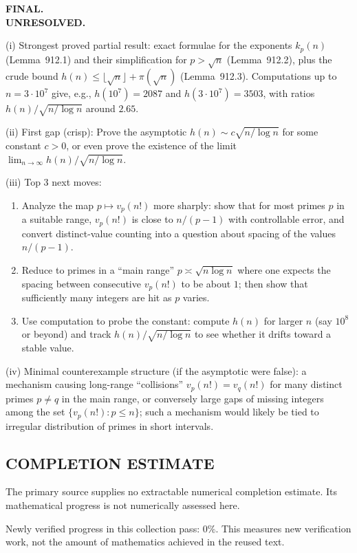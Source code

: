 \medskip
\noindent\textbf{FINAL.}\\
\textbf{UNRESOLVED.}

(i) Strongest proved partial result: exact formulae for the exponents $k_p(n)$ (Lemma~912.1) and their simplification for $p>\sqrt{n}$ (Lemma~912.2), plus the crude bound $h(n)\le \lfloor\sqrt n\rfloor+\pi(\sqrt n)$ (Lemma~912.3). Computations up to $n=3\cdot 10^7$ give, e.g., $h(10^7)=2087$ and $h(3\cdot 10^7)=3503$, with ratios $h(n)/\sqrt{n/\log n}$ around $2.65$.

(ii) First gap (crisp): Prove the asymptotic $h(n)\sim c\sqrt{n/\log n}$ for some constant $c>0$, or even prove the existence of the limit $\lim_{n\to\infty} h(n)/\sqrt{n/\log n}$.

(iii) Top 3 next moves:
\begin{enumerate}
\item Analyze the map $p\mapsto v_p(n!)$ more sharply: show that for most primes $p$ in a suitable range, $v_p(n!)$ is close to $n/(p-1)$ with controllable error, and convert distinct-value counting into a question about spacing of the values $n/(p-1)$.
\item Reduce to primes in a ``main range'' $p\asymp \sqrt{n\log n}$ where one expects the spacing between consecutive $v_p(n!)$ to be about $1$; then show that sufficiently many integers are hit as $p$ varies.
\item Use computation to probe the constant: compute $h(n)$ for larger $n$ (say $10^8$ or beyond) and track $h(n)/\sqrt{n/\log n}$ to see whether it drifts toward a stable value.
\end{enumerate}

(iv) Minimal counterexample structure (if the asymptotic were false): a mechanism causing long-range ``collisions'' $v_p(n!)=v_q(n!)$ for many distinct primes $p\ne q$ in the main range, or conversely large gaps of missing integers among the set $\{v_p(n!):p\le n\}$; such a mechanism would likely be tied to irregular distribution of primes in short intervals.




\subsection*{COMPLETION ESTIMATE}
The primary source supplies no extractable numerical completion estimate. Its mathematical progress is not numerically assessed here.

Newly verified progress in this collection pass: $0\%$. This measures new verification work, not the amount of mathematics achieved in the reused text.
